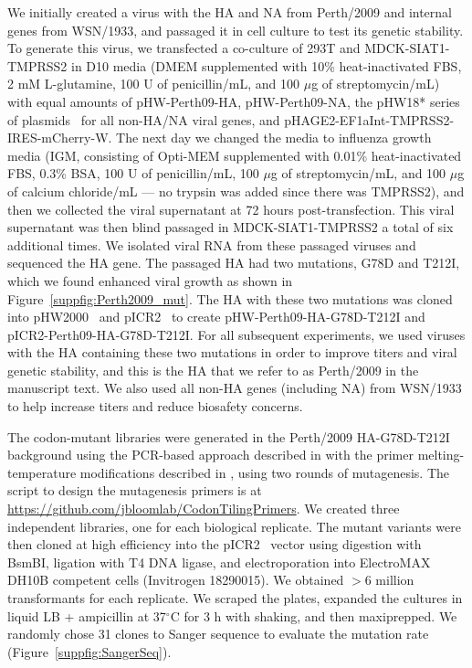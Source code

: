 \documentclass[9pt,twocolumn,twoside]{pnas-new}
\begin{document}
{We initially created a virus with the HA and NA from Perth/2009 and internal genes from WSN/1933, and passaged it in cell culture to test its genetic stability.
To generate this virus, we transfected a co-culture of 293T and MDCK-SIAT1-TMPRSS2 in D10 media (DMEM supplemented with 10\% heat-inactivated FBS, 2 mM L-glutamine, 100 U of penicillin/mL, and 100 $\mu$g of streptomycin/mL) with equal amounts of pHW-Perth09-HA, pHW-Perth09-NA, the pHW18* series of plasmids~\cite{hoffmann2000dna} for all non-HA/NA viral genes, and pHAGE2-EF1aInt-TMPRSS2-IRES-mCherry-W.
The next day we changed the media to influenza growth media (IGM, consisting of Opti-MEM supplemented with 0.01\% heat-inactivated FBS, 0.3\% BSA, 100 U of penicillin/mL, 100 $\mu$g of streptomycin/mL, and 100 $\mu$g of calcium chloride/mL --- no trypsin was added since there was TMPRSS2), and then we collected the viral supernatant at 72 hours post-transfection.
This viral supernatant was then blind passaged in MDCK-SIAT1-TMPRSS2 a total of six additional times.
We isolated viral RNA from these passaged viruses and sequenced the HA gene.
The passaged HA had two mutations, G78D and T212I, which we found enhanced viral growth as shown in Figure~\ref{suppfig:Perth2009_mut}.
The HA with these two mutations was cloned into pHW2000~\citep{hoffmann2000dna} and pICR2~\cite{ashenberg2017deep} to create pHW-Perth09-HA-G78D-T212I and pICR2-Perth09-HA-G78D-T212I.
For all subsequent experiments, we used viruses with the HA containing these two mutations in order to improve titers and viral genetic stability, and this is the HA that we refer to as Perth/2009 in the manuscript text.
We also used all non-HA genes (including NA) from WSN/1933 to help increase titers and reduce biosafety concerns.

The codon-mutant libraries were generated in the Perth/2009 HA-G78D-T212I background using the PCR-based approach described in \cite{bloom2014experimentally} with the primer melting-temperature modifications described in \cite{dingens2017comprehensive}, using two rounds of mutagenesis.
The script to design the mutagenesis primers is at \url{https://github.com/jbloomlab/CodonTilingPrimers}.
We created three independent libraries, one for each biological replicate.
The mutant variants were then cloned at high efficiency into the pICR2~\cite{ashenberg2017deep} vector using digestion with BsmBI, ligation with T4 DNA ligase, and electroporation into ElectroMAX DH10B competent cells (Invitrogen 18290015).
We obtained $>$6 million transformants for each replicate.
We scraped the plates, expanded the cultures in liquid LB + ampicillin at 37$^{\circ}$C for 3 h with shaking, and then maxiprepped.
We randomly chose 31 clones to Sanger sequence to evaluate the mutation rate (Figure~\ref{suppfig:SangerSeq}).

}
\end{document}

